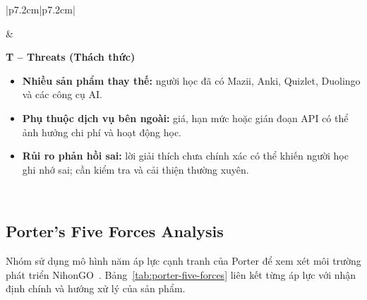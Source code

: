 \begin{table}[htbp]
\begin{tabular}{|p{7.2cm}|p{7.2cm}|}
\begin{minipage}[t]{\linewidth}
\begin{itemize}[leftmargin=1.2em,itemsep=4pt,parsep=0pt,topsep=5pt]
\end{itemize}\smallskip
\end{minipage}
&
\begin{minipage}[t]{\linewidth}
\raggedright\smallskip
\textbf{T -- Threats (Thách thức)}
\begin{itemize}[leftmargin=1.2em,itemsep=4pt,parsep=0pt,topsep=5pt]
  \item \textbf{Nhiều sản phẩm thay thế:} người học đã có Mazii, Anki, Quizlet, Duolingo và các công cụ AI.
  \item \textbf{Phụ thuộc dịch vụ bên ngoài:} giá, hạn mức hoặc gián đoạn API có thể ảnh hưởng chi phí và hoạt động học.
  \item \textbf{Rủi ro phản hồi sai:} lời giải thích chưa chính xác có thể khiến người học ghi nhớ sai; cần kiểm tra và cải thiện thường xuyên.
\end{itemize}\smallskip
\end{minipage}
\\ \hline
\end{tabular}
\endgroup
\end{table}

\Needspace{20cm}
\subsection{Porter's Five Forces Analysis}

Nhóm sử dụng mô hình năm áp lực cạnh tranh của Porter để xem xét môi trường phát triển NihonGO~\cite{hbs-fiveforces}. Bảng~\ref{tab:porter-five-forces} liên kết từng áp lực với nhận định chính và hướng xử lý của sản phẩm.

